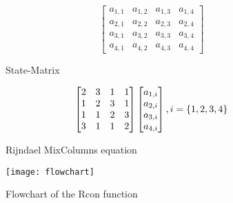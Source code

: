\begin{figure}
  \begin{equation}
    \begin{bmatrix}
      a_{1, 1} & a_{1, 2} & a_{1, 3} & a_{1, 4} \\
      a_{2, 1} & a_{2, 2} & a_{2, 3} & a_{2, 4} \\
      a_{3, 1} & a_{3, 2} & a_{3, 3} & a_{3, 4} \\
      a_{4, 1} & a_{4, 2} & a_{4, 3} & a_{4, 4}
    \end{bmatrix}
  \end{equation}
  \caption{State-Matrix}
  \label{matrix:state}
\end{figure}

\begin{figure}
  \begin{equation}
    \begin{bmatrix}
      2 & 3 & 1 & 1 \\
      1 & 2 & 3 & 1 \\
      1 & 1 & 2 & 3 \\
      3 & 1 & 1 & 2
    \end{bmatrix}
    \*
    \begin{bmatrix}
      a_{1,i} \\ 
      a_{2,i} \\
      a_{3,i} \\
      a_{4,i}
    \end{bmatrix}
    ,i = \{1,2,3,4\}
  \end{equation}
  \caption{Rijndael MixColumns equation}
  \label{matrix:rijMix}
\end{figure}


\begin{figure}
  \begin{center}
    \texttt{[image: flowchart]}
  \end{center}
  \caption{Flowchart of the Rcon function}
  \label{app:flowchart}
\end{figure}

